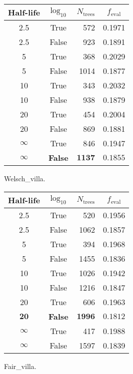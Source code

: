 \begin{margintable}
  \begin{tabular}{@{}ccrc@{}}
    Half-life & $\log_{10}$ & $N_\mathrm{trees}$ & $f_\mathrm{eval}$ \\
    \midrule
    \num{2.5} & True & \num{572} & \num{0.1971} \\
    \num{2.5} & False & \num{923} & \num{0.1891} \\
    \num{5} & True & \num{368} & \num{0.2029} \\
    \num{5} & False & \num{1014} & \num{0.1877} \\
    \num{10} & True & \num{343} & \num{0.2032} \\
    \num{10} & False & \num{938} & \num{0.1879} \\
    \num{20} & True & \num{454} & \num{0.2004} \\
    \num{20} & False & \num{869} & \num{0.1881} \\
    $\infty$ & True & \num{846} & \num{0.1947} \\
    $\bm{\infty}$ & \textbf{False} & $\mathbf{1137}$ & $\mathbf{0.1855}$ \\
  \end{tabular}
  \caption{\label{tab:h:HPO_initial_Welsch_villa}Welsch_villa.}
\end{margintable}

\begin{margintable}
  \begin{tabular}{@{}ccrc@{}}
    Half-life & $\log_{10}$ & $N_\mathrm{trees}$ & $f_\mathrm{eval}$ \\
    \midrule
    \num{2.5} & True & \num{520} & \num{0.1956} \\
    \num{2.5} & False & \num{1062} & \num{0.1857} \\
    \num{5} & True & \num{394} & \num{0.1968} \\
    \num{5} & False & \num{1455} & \num{0.1836} \\
    \num{10} & True & \num{1026} & \num{0.1942} \\
    \num{10} & False & \num{1216} & \num{0.1847} \\
    \num{20} & True & \num{606} & \num{0.1963} \\
    $\mathbf{20}$ & \textbf{False} & $\mathbf{1996}$ & $\mathbf{0.1812}$ \\
    $\infty$ & True & \num{417} & \num{0.1988} \\
    $\infty$ & False & \num{1597} & \num{0.1839} \\
  \end{tabular}
  \caption{\label{tab:h:HPO_initial_Fair_villa}Fair_villa.}
\end{margintable}
